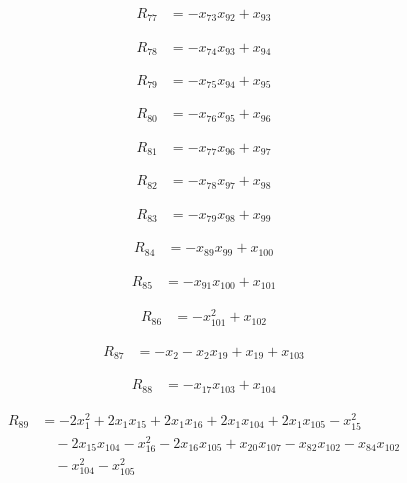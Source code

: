 \documentclass[11pt,letterpaper]{article}
\theoremstyle{definition}
\theoremstyle{remark}
\begin{document}
\begin{align*}
R_{77} &= -x_{73} x_{92} +x_{93}
\end{align*}

\begin{align*}
R_{78} &= -x_{74} x_{93} +x_{94}
\end{align*}

\begin{align*}
R_{79} &= -x_{75} x_{94} +x_{95}
\end{align*}

\begin{align*}
R_{80} &= -x_{76} x_{95} +x_{96}
\end{align*}

\begin{align*}
R_{81} &= -x_{77} x_{96} +x_{97}
\end{align*}

\begin{align*}
R_{82} &= -x_{78} x_{97} +x_{98}
\end{align*}

\begin{align*}
R_{83} &= -x_{79} x_{98} +x_{99}
\end{align*}

\begin{align*}
R_{84} &= -x_{89} x_{99} +x_{100}
\end{align*}

\begin{align*}
R_{85} &= -x_{91} x_{100} +x_{101}
\end{align*}

\begin{align*}
R_{86} &= -x_{101}^{2} +x_{102}
\end{align*}

\begin{align*}
R_{87} &= -x_{2} -x_{2} x_{19} +x_{19} +x_{103}
\end{align*}

\begin{align*}
R_{88} &= -x_{17} x_{103} +x_{104}
\end{align*}

\begin{align*}
R_{89} &= -2 x_{1}^{2} +2 x_{1} x_{15} +2 x_{1} x_{16} +2 x_{1} x_{104} +2 x_{1} x_{105} -x_{15}^{2} \\
&\quad -2 x_{15} x_{104} -x_{16}^{2} -2 x_{16} x_{105} +x_{20} x_{107} -x_{82} x_{102} -x_{84} x_{102} \\
&\quad -x_{104}^{2} -x_{105}^{2}
\end{align*}
\end{document}
